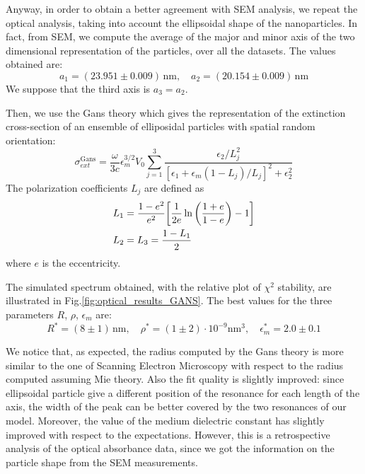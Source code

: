\documentclass[prb,twocolumn]{revtex4-1}
\begin{document}
Anyway, in order to obtain a better agreement with SEM analysis, we repeat the optical analysis, taking into account the ellipsoidal shape of the nanoparticles. 
In fact, from SEM, we compute the average of the major and minor axis of the two dimensional representation of the particles, over all the datasets. The values obtained are:
\begin{equation*}
    a_1 = (23.951 \pm 0.009) \, \text{nm}, \quad a_2 = (20.154 \pm 0.009) \, \text{nm}
\end{equation*}
We suppose that the third axis is $a_3=a_2$. 

Then, we use the Gans theory which gives the representation of the extinction cross-section of an ensemble of elliposidal particles with spatial random orientation:
\begin{equation}
\sigma_{ext}^{\text{Gans}} = \frac{\omega}{3c} \epsilon_m^{3/2}V_{0} \sum^{3}_{j=1}{\frac{\epsilon_2/L_j^2}{[\epsilon_1 + \epsilon_m(1-L_j)/L_j]^2 + \epsilon_2^2}}
\end{equation}
The polarization coefficients $L_j$ are defined as 
\begin{subequations}
\begin{align}
  L_1 &= \frac{1-e^2}{e^2} \qty[\frac{1}{2e}\ln{\qty( \frac{1+e}{1-e})}-1] \\
  L_2 &= L_3 = \frac{1-L_1}{2} 
  \end{align}
\end{subequations}
where $e$ is the eccentricity.





The simulated spectrum obtained, with the relative plot of $\chi^2$ stability, are illustrated in Fig.\ref{fig:optical_results_GANS}.
The best values for the three parameters $R$, $\rho$, $\epsilon_m$ are:
\begin{equation*}
    R^* = (8 \pm 1) \, \text{nm}, \quad \rho^* = (1 \pm 2) \cdot 10^{-9} \text{nm}^3 , \quad \epsilon_m^* = 2.0 \pm 0.1
\end{equation*}

We notice that, as expected, the radius computed by the Gans theory is more similar to the one of Scanning Electron Microscopy with respect to the radius computed assuming Mie theory. 
Also the fit quality is slightly improved: since ellipsoidal particle give a different position of the resonance for each length of the axis, the width of the peak can be better covered by the two resonances of our model.
Moreover, the value of the medium dielectric constant has slightly improved with respect to the expectations.
However, this is a retrospective analysis of the optical absorbance data, since we got the information on the particle shape from the SEM measurements. 
\end{document}
